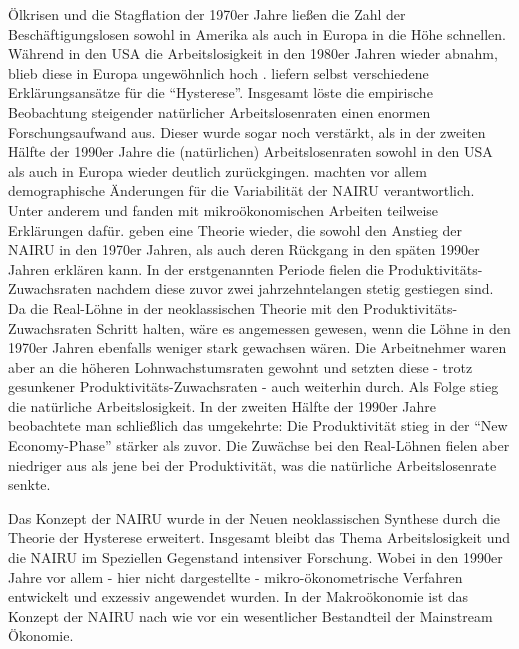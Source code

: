 Ölkrisen und die Stagflation der 1970er Jahre ließen die Zahl der Beschäftigungslosen sowohl in Amerika als auch in Europa in die Höhe schnellen. Während in den USA die Arbeitslosigkeit in den 1980er Jahren wieder abnahm, blieb diese in Europa ungewöhnlich hoch \parencite[S. 18]{Blanchard1986}. \textcite{Blanchard1986} liefern selbst verschiedene Erklärungsansätze für die "`Hysterese"'. Insgesamt löste die empirische Beobachtung steigender natürlicher Arbeitslosenraten einen enormen Forschungsaufwand aus. Dieser wurde sogar noch verstärkt, als in der zweiten Hälfte der 1990er Jahre die (natürlichen) Arbeitslosenraten sowohl in den USA als auch in Europa wieder deutlich zurückgingen. \textcite{Staiger2001} machten vor allem demographische Änderungen für die Variabilität der NAIRU verantwortlich. Unter anderem \textcite{Krueger1999} und \textcite{Autor2001} fanden mit mikroökonomischen Arbeiten teilweise Erklärungen dafür. \textcite{Ball2002} geben eine Theorie wieder, die sowohl den Anstieg der NAIRU in den 1970er Jahren, als auch deren Rückgang in den späten 1990er Jahren erklären kann. In der erstgenannten Periode fielen die Produktivitäts-Zuwachsraten nachdem diese zuvor zwei jahrzehntelangen stetig gestiegen sind. Da die Real-Löhne in der neoklassischen Theorie mit den Produktivitäts-Zuwachsraten Schritt halten, wäre es angemessen gewesen, wenn die Löhne in den 1970er Jahren ebenfalls weniger stark gewachsen wären. Die Arbeitnehmer waren aber an die höheren Lohnwachstumsraten gewohnt und setzten diese - trotz gesunkener Produktivitäts-Zuwachsraten - auch weiterhin durch. Als Folge stieg die natürliche Arbeitslosigkeit. In der zweiten Hälfte der 1990er Jahre beobachtete man schließlich das umgekehrte: Die Produktivität stieg in der "`New Economy-Phase"' stärker als zuvor. Die Zuwächse bei den Real-Löhnen fielen aber niedriger aus als jene bei der Produktivität, was die natürliche Arbeitslosenrate senkte.

Das Konzept der NAIRU wurde in der Neuen neoklassischen Synthese durch die Theorie der Hysterese erweitert. Insgesamt bleibt das Thema Arbeitslosigkeit und die NAIRU im Speziellen Gegenstand intensiver Forschung. Wobei in den 1990er Jahre vor allem - hier nicht dargestellte - mikro-ökonometrische Verfahren entwickelt und exzessiv angewendet wurden. In der Makroökonomie ist das Konzept der NAIRU nach wie vor ein wesentlicher Bestandteil der Mainstream Ökonomie.






